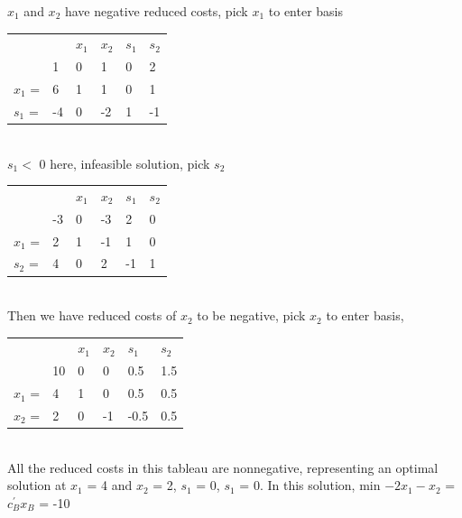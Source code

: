 \documentclass{article}
\newcommand{\1}{\bm 1}
\begin{document}
$x_1$ and $x_2$ have negative reduced costs, pick $x_1$ to enter basis

\begin{tabular}{l|l|l|l|l|l|}
\cline{2-6}
&  & $x_1$ & $x_2$ & $s_1$ & $s_2$ \\ \cline{2-6} 
& 1 & 0 & 1 & 0 & 2 \\ \cline{2-6} 
 $x_1$ = & 6 & 1 & 1 & 0 & 1 \\ \cline{2-6} 
 $s_1$ = & -4 & 0 & -2 & 1 & -1\\ \cline{2-6} 
\end{tabular}
\\

$s_1 < $  0 here, infeasible solution, pick $s_2$

\begin{tabular}{l|l|l|l|l|l|}
\cline{2-6}
&  & $x_1$ & $x_2$ & $s_1$ & $s_2$ \\ \cline{2-6} 
& -3 & 0 & -3 & 2 & 0 \\ \cline{2-6} 
 $x_1$ = & 2 & 1 & -1 & 1 & 0 \\ \cline{2-6} 
 $s_2$ = & 4 & 0 & 2 & -1 & 1\\ \cline{2-6} 
\end{tabular}
\\
Then we have reduced costs of $x_2$ to be negative, pick $x_2$ to enter basis,

\begin{tabular}{l|l|l|l|l|l|}
\cline{2-6}
&  & $x_1$ & $x_2$ & $s_1$ & $s_2$ \\ \cline{2-6} 
& 10 & 0 & 0 & 0.5 & 1.5 \\ \cline{2-6} 
 $x_1$ = & 4 & 1 & 0 & 0.5 & 0.5 \\ \cline{2-6} 
 $x_2$ = & 2 & 0 & -1 & -0.5 & 0.5\\ \cline{2-6} 
\end{tabular}
\\
All the reduced costs in this tableau are nonnegative, representing an optimal solution at $x_1$ = 4 and $x_2$ = 2, $s_1$ = 0, $s_1$ = 0. In this solution, min $-2x_1 -x_2$ = $c^{'}_B x_B$ = -10
\end{document}
